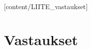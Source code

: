 [content/LIITE_vastaukset]


\newpage 
\newpage 
\newpage 


\liitetyyli


\newpage \section{Vastaukset} 

